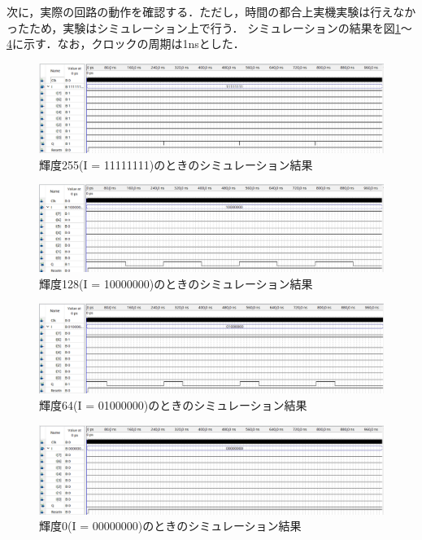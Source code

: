 \documentclass{jlreq}
\numberwithin{equation}{section}
\begin{document}
次に，実際の回路の動作を確認する．ただし，時間の都合上実機実験は行えなかったため，実験はシミュレーション上で行う．
シミュレーションの結果を図\ref{fig:result_pwm_255}～\ref{fig:result_pwm_0}に示す．なお，クロックの周期は1nsとした．
\begin{figure}[H]
	\centering
	\includegraphics[width=\textwidth]{assets/pwm_255_1ns.png}
	\caption{輝度255(I = 11111111)のときのシミュレーション結果}
	\label{fig:result_pwm_255}
\end{figure}
\begin{figure}[H]
	\centering
	\includegraphics[width=\textwidth]{assets/pwm_128_1ns.png}
	\caption{輝度128(I = 10000000)のときのシミュレーション結果}
	\label{fig:result_pwm_128}
\end{figure}
\begin{figure}[H]
	\centering
	\includegraphics[width=\textwidth]{assets/pwm_64_1ns.png}
	\caption{輝度64(I = 01000000)のときのシミュレーション結果}
	\label{fig:result_pwm_64}
\end{figure}
\begin{figure}[H]
	\centering
	\includegraphics[width=\textwidth]{assets/pwm_0_1ns.png}
	\caption{輝度0(I = 00000000)のときのシミュレーション結果}
	\label{fig:result_pwm_0}
\end{figure}
\end{document}
